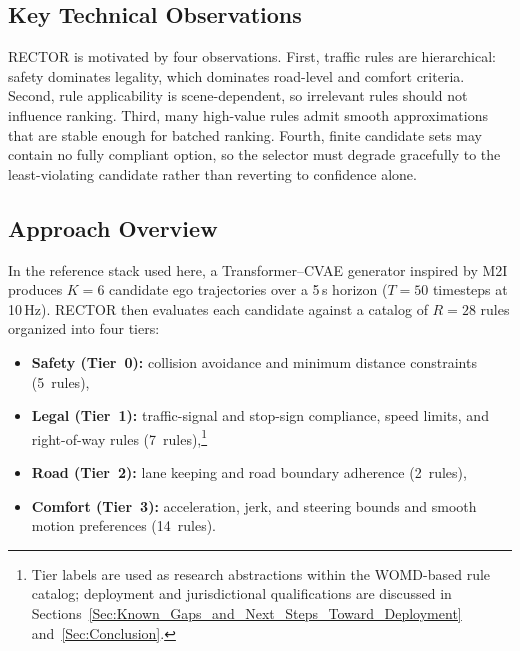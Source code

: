 \subsection{Key Technical Observations}
\label{subsec:observations}

RECTOR is motivated by four observations. First, traffic rules are hierarchical: safety dominates legality, which dominates road-level and comfort criteria. Second, rule applicability is scene-dependent, so irrelevant rules should not influence ranking. Third, many high-value rules admit smooth approximations that are stable enough for batched ranking. Fourth, finite candidate sets may contain no fully compliant option, so the selector must degrade gracefully to the least-violating candidate rather than reverting to confidence alone.

\subsection{Approach Overview}
\label{subsec:approach}

In the reference stack used here, a Transformer--CVAE generator inspired by M2I produces $K{=}6$ candidate ego trajectories over a 5\,s horizon ($T{=}50$ timesteps at 10\,Hz). RECTOR then evaluates each candidate against a catalog of $R{=}28$ rules organized into four tiers:
\begin{itemize}[leftmargin=1.5em] 

\item \textbf{Safety (Tier~0):} collision avoidance and minimum distance
constraints (5~rules), 

\item \textbf{Legal (Tier~1):} traffic-signal and stop-sign compliance, speed limits, and right-of-way rules (7~rules),\footnote{Tier labels are used as research abstractions within the WOMD-based rule catalog; deployment and jurisdictional qualifications are discussed in Sections~\ref{Sec:Known_Gaps_and_Next_Steps_Toward_Deployment} and~\ref{Sec:Conclusion}.}


\item \textbf{Road (Tier~2):} lane keeping and road boundary adherence
(2~rules), \item \textbf{Comfort (Tier~3):} acceleration, jerk, and steering bounds
and smooth motion preferences (14~rules).

\end{itemize}

